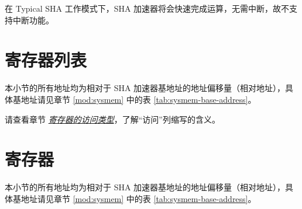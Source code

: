 \documentclass[main\_\_CN.tex]{subfiles}
\begin{document}
在 Typical SHA 工作模式下，SHA 加速器将会快速完成运算，无需中断，故不支持中断功能。

\clearpage
\hypertarget{sha-reg-summ}{}
\section{寄存器列表} \label{sec:sha-reg-summ}

本小节的所有地址均为相对于 SHA 加速器基地址的地址偏移量（相对地址），具体基地址请见章节 \ref{mod:sysmem} \textit{} 中的表 \ref{tab:sysmem-base-address}。

请查看章节 \hyperref[glossary-access-types]{\textit{寄存器的访问类型}}，了解“访问”列缩写的含义。



\section{寄存器}

本小节的所有地址均为相对于 SHA 加速器基地址的地址偏移量（相对地址），具体基地址请见章节 \ref{mod:sysmem} \textit{} 中的表 \ref{tab:sysmem-base-address}。


\end{document}
